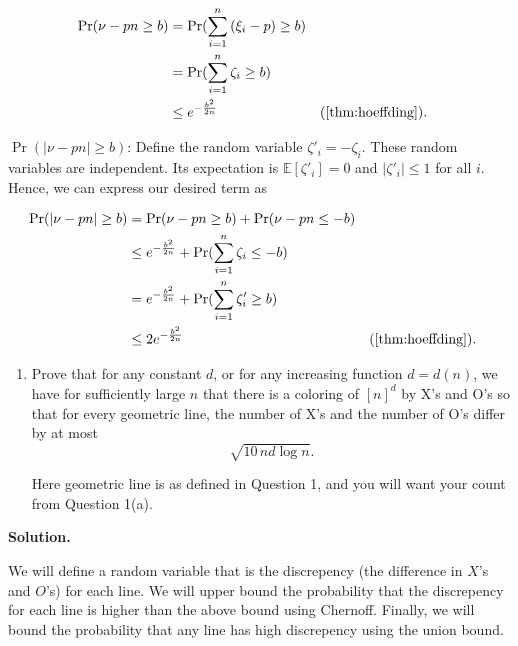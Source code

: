 \documentclass[11pt,letterpaper]{article}
\theoremstyle{definition}
\newcommand{\EE}{\mathbb{E}}
\newcommand{\solution}{\medskip\noindent\textbf{Solution.}\par\medskip}
\begin{document}
\begin{align*}
    \Pr(\nu-pn\geq b) &=\Pr(\sum_{i=1}^n\left(\xi_i-p\right) \geq b) \\
    &=\Pr(\sum_{i=1}^n\zeta_i\geq b) \\
    &\leq e^{-\frac{b^2}{2n}} &&(\Cref{thm:hoeffding}).
\end{align*}

\ul{$\Pr(\lvert\nu - pn\rvert\geq b)$}:
Define the random variable $\zeta'_i = -\zeta_i$. 
These random variables are independent.
Its expectation is $\EE[\zeta'_i]=0$ and $\lvert \zeta'_i\rvert\leq 1$ for all $i$. 
Hence, we can express our desired term as

\begin{align*}
    \Pr(|\nu-pn|\geq b) &= \Pr(\nu-pn\geq b) + \Pr(\nu-pn\leq -b) \\
    &\leq e^{-\frac{b^2}{2n}} + \Pr(\sum_{i=1}^n\zeta_i\leq -b) \\
    &=e^{-\frac{b^2}{2n}} + \Pr(\sum_{i=1}^n\zeta'_i\geq b) \\
    &\leq 2e^{-\frac{b^2}{2n}} &&(\Cref{thm:hoeffding}).
\end{align*}

\begin{enumerate}[resume]
\item Prove that for any constant $d$, or for any increasing function $d = d(n)$, we have for sufficiently large $n$ that there is a coloring of $[n]^d$ by X's and O's so that for every geometric line, the number of X's and the number of O's differ by at most
\[
\sqrt{10\, n d\log n}.
\]

Here geometric line is as defined in Question 1, and you will want your count from Question 1(a).
\end{enumerate}

\solution
We will define a random variable that is the discrepency (the difference in $X$'s and $O$'s) for each line. 
We will upper bound the probability that the discrepency for each line is higher than the above bound using Chernoff. 
Finally, we will bound the probability that any line has high discrepency using the union bound.
\end{document}
